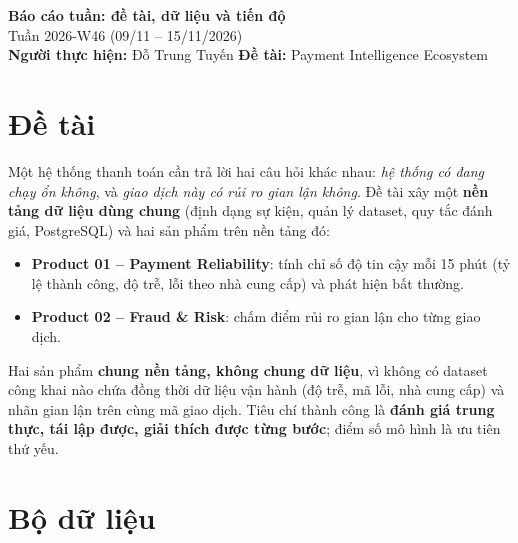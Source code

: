\documentclass[11pt,a4paper]{article}
\begin{document}
\begin{tcolorbox}[enhanced,colback=navy,colframe=navy,arc=3pt,left=12pt,right=12pt,top=10pt,bottom=10pt]
  \color{white}
  {\Large\bfseries Báo cáo tuần: đề tài, dữ liệu và tiến độ}\\[2pt]
  {\small Tuần 2026-W46 (09/11 – 15/11/2026)}\\[6pt]
  {\small\textbf{Người thực hiện:} Đỗ Trung Tuyến \quad
   \textbf{Đề tài:} Payment Intelligence Ecosystem}
\end{tcolorbox}

\section{Đề tài}

Một hệ thống thanh toán cần trả lời hai câu hỏi khác nhau: \emph{hệ thống có đang chạy ổn không}, và
\emph{giao dịch này có rủi ro gian lận không}. Đề tài xây một \textbf{nền tảng dữ liệu dùng chung}
(định dạng sự kiện, quản lý dataset, quy tắc đánh giá, PostgreSQL) và hai sản phẩm trên nền tảng đó:

\begin{itemize}
  \item \textbf{Product 01 – Payment Reliability}: tính chỉ số độ tin cậy mỗi 15 phút (tỷ lệ thành công,
        độ trễ, lỗi theo nhà cung cấp) và phát hiện bất thường.
  \item \textbf{Product 02 – Fraud \& Risk}: chấm điểm rủi ro gian lận cho từng giao dịch.
\end{itemize}

Hai sản phẩm \textbf{chung nền tảng, không chung dữ liệu}, vì không có dataset công khai nào chứa đồng
thời dữ liệu vận hành (độ trễ, mã lỗi, nhà cung cấp) và nhãn gian lận trên cùng mã giao dịch. Tiêu chí
thành công là \textbf{đánh giá trung thực, tái lập được, giải thích được từng bước}; điểm số mô hình là
ưu tiên thứ yếu.

\section{Bộ dữ liệu}
\end{document}
